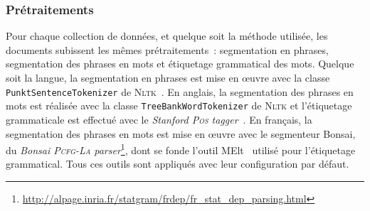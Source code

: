         \begin{table}[!h]
          \centering

          \caption{Rappel des corpus utilisés pour évaluer la sélection des
                   candidats 
                   \label{tab:topicrank:corpora_recap}}
        \end{table}

      \subsubsection{Prétraitements}
      \label{subsubsec:main-automatic_keyphrase_annotation-keyphrase_candidate_selection-evaluation-preprocessing}
        Pour chaque collection de données, et quelque soit la méthode utilisée,
        les documents subissent les mêmes prétraitements~: segmentation en
        phrases, segmentation des phrases en mots et étiquetage grammatical des
        mots. Quelque soit la langue, la segmentation en phrases est mise en
        \oe{}uvre avec la classe \texttt{PunktSentenceTokenizer} de
        \textsc{Nltk}~\cite{bird2009nltk}. En anglais, la segmentation des
        phrases en mots est réalisée avec la classe
        \texttt{TreeBankWordTokenizer} de \textsc{Nltk} et l'étiquetage
        grammaticale est effectué avec le \textit{Stanford \textsc{Pos}
        tagger}~\cite{toutanova2003stanfordpostagger}. En français, la
        segmentation des phrases en mots est mise en \oe{}uvre avec le
        segmenteur Bonsai, du \textit{Bonsai \textsc{Pcfg-La}
        parser}\footnote{\url{http://alpage.inria.fr/statgram/frdep/fr_stat_dep_parsing.html}},
        dont se fonde l'outil MElt~\cite{denis2009melt} utilisé pour
        l'étiquetage grammatical. Tous ces outils sont appliqués avec leur
        configuration par défaut.
      
